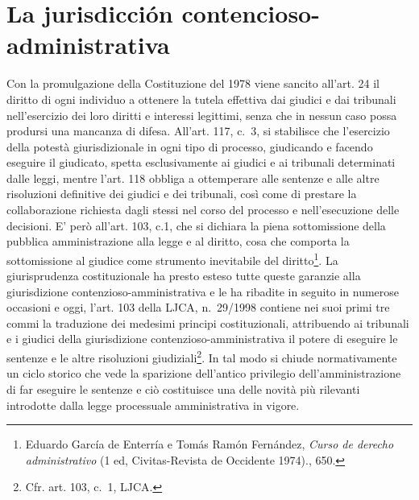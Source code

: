 \documentclass[12pt,it,a4paper,]{report}
\begin{document}
\hypertarget{la-jurisdicciuxf3n-contencioso-administrativa}{%
\section{La jurisdicción
contencioso-administrativa}\label{la-jurisdicciuxf3n-contencioso-administrativa}}

Con la promulgazione della Costituzione del 1978 viene sancito all'art.
24 il diritto di ogni individuo a ottenere la tutela effettiva dai
giudici e dai tribunali nell'esercizio dei loro diritti e interessi
legittimi, senza che in nessun caso possa prodursi una mancanza di
difesa. All'art. 117, c.~3, si stabilisce che l'esercizio della potestà
giurisdizionale in ogni tipo di processo, giudicando e facendo eseguire
il giudicato, spetta esclusivamente ai giudici e ai tribunali
determinati dalle leggi, mentre l'art. 118 obbliga a ottemperare alle
sentenze e alle altre risoluzioni definitive dei giudici e dei
tribunali, così come di prestare la collaborazione richiesta dagli
stessi nel corso del processo e nell'esecuzione delle decisioni. E' però
all'art. 103, c.1, che si dichiara la piena sottomissione della pubblica
amministrazione alla legge e al diritto, cosa che comporta la
sottomissione al giudice come strumento inevitabile del
diritto\footnote{{Eduardo García de Enterría e Tomás Ramón Fernández,
  \emph{Curso de derecho administrativo} (1 ed, Civitas-Revista de
  Occidente 1974).}, 650.}. La giurisprudenza costituzionale ha presto
esteso tutte queste garanzie alla giurisdizione
contenzioso-amministrativa e le ha ribadite in seguito in numerose
occasioni e oggi, l'art. 103 della LJCA, n.~29/1998 contiene nei suoi
primi tre commi la traduzione dei medesimi principi costituzionali,
attribuendo ai tribunali e i giudici della giurisdizione
contenzioso-amministrativa il potere di eseguire le sentenze e le altre
risoluzioni giudiziali\footnote{Cfr. art. 103, c.~1, LJCA.}. In tal modo
si chiude normativamente un ciclo storico che vede la sparizione
dell'antico privilegio dell'amministrazione di far eseguire le sentenze
e ciò costituisce una delle novità più rilevanti introdotte dalla legge
processuale amministrativa in vigore.
\end{document}
